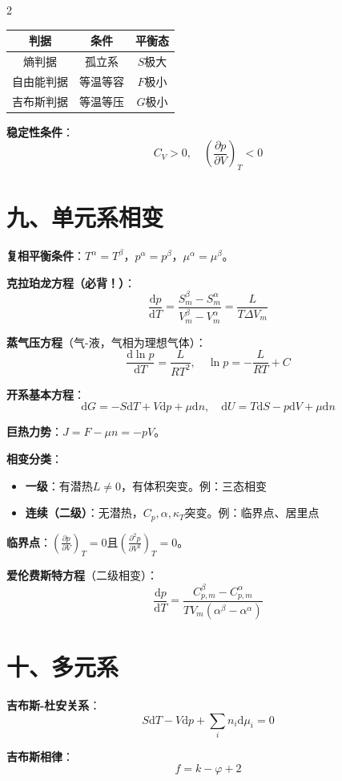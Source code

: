 \documentclass[10pt,a4paper,fontset=mac]{ctexart}
\newcommand{\dd}{\mathrm{d}}
\newcommand{\đ}{\mathrm{đ}}
\begin{document}
\begin{multicols}{2}
\begin{tabular}{c|c|c}
判据 & 条件 & 平衡态 \\
\hline
熵判据 & 孤立系 & $S$极大 \\
自由能判据 & 等温等容 & $F$极小 \\
吉布斯判据 & 等温等压 & $G$极小 \\
\end{tabular}

\textbf{稳定性条件}：
\[
\boxed{C_V>0,\quad\left(\frac{\partial p}{\partial V}\right)_T<0}
\]

\section*{九、单元系相变}

\textbf{复相平衡条件}：$T^\alpha=T^\beta$，$p^\alpha=p^\beta$，$\mu^\alpha=\mu^\beta$。

\textbf{克拉珀龙方程（必背！）}：
\[
\boxed{\frac{\dd p}{\dd T}=\frac{S_m^\beta-S_m^\alpha}{V_m^\beta-V_m^\alpha}=\frac{L}{T\Delta V_m}}
\]

\textbf{蒸气压方程}（气-液，气相为理想气体）：
\[
\frac{\dd\ln p}{\dd T}=\frac{L}{RT^2},\quad\ln p=-\frac{L}{RT}+C
\]

\textbf{开系基本方程}：
\[
\dd G=-S\dd T+V\dd p+\mu\dd n,\quad
\dd U=T\dd S-p\dd V+\mu\dd n
\]

\textbf{巨热力势}：$J=F-\mu n=-pV$。

\textbf{相变分类}：
\begin{itemize}
\item \textbf{一级}：有潜热$L\neq0$，有体积突变。例：三态相变
\item \textbf{连续（二级）}：无潜热，$C_p,\alpha,\kappa_T$突变。例：临界点、居里点
\end{itemize}

\textbf{临界点}：$(\frac{\partial p}{\partial V})_T=0$且$(\frac{\partial^2 p}{\partial V^2})_T=0$。

\textbf{爱伦费斯特方程}（二级相变）：
\[
\frac{\dd p}{\dd T}=\frac{C_{p,m}^\beta-C_{p,m}^\alpha}{TV_m(\alpha^\beta-\alpha^\alpha)}
\]

\section*{十、多元系}

\textbf{吉布斯-杜安关系}：
\[
S\dd T-V\dd p+\sum_i n_i\dd\mu_i=0
\]

\textbf{吉布斯相律}：
\[
\boxed{f=k-\varphi+2}
\]


\end{multicols}
\end{document}

